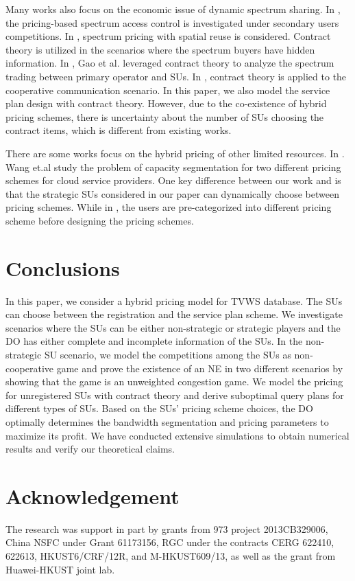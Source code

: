 \documentclass[journal]{IEEEtran}
\begin{document}
Many works also focus on the economic issue of dynamic spectrum sharing. In \cite{add1}, the pricing-based spectrum access control is investigated under secondary users competitions. In \cite{add2}, spectrum pricing with spatial reuse is considered. Contract theory is utilized in the scenarios where the spectrum buyers have hidden information. In \cite{JSAC10}, Gao et al. leveraged contract theory to analyze the spectrum trading between primary operator and SUs. In \cite{dyspan11Duan}, contract theory is applied to the cooperative communication scenario. In this paper, we also model the service plan design with contract theory. However, due to the co-existence of hybrid pricing schemes, there is uncertainty about the number of SUs choosing the contract items, which is different from existing works.

There are some works focus on the hybrid pricing of other limited resources. In \cite{icdcs12segmentation}. Wang et.al study the problem of capacity segmentation for two different pricing schemes for cloud service providers. One key difference between our work and \cite{icdcs12segmentation} is that the strategic SUs considered in our paper can dynamically choose between pricing schemes. While in \cite{icdcs12segmentation}, the users are pre-categorized into different pricing scheme before designing the pricing schemes.

\section{Conclusions}
\label{sec:conclusion}

In this paper, we consider a hybrid pricing model for TVWS database. The SUs can choose between the registration and the service plan scheme. We investigate scenarios where the SUs can be either non-strategic or strategic players and the DO has either complete and incomplete information of the SUs. In the non-strategic SU scenario, we model the competitions among the SUs as non-cooperative game and prove the existence of an NE in two different scenarios by showing that the game is an unweighted congestion game. We model the pricing for unregistered SUs with contract theory and derive suboptimal query plans for different types of SUs. Based on the SUs' pricing scheme choices, the DO optimally determines the bandwidth segmentation and pricing parameters to maximize its profit. We have conducted extensive simulations to obtain numerical results and verify our theoretical claims.

\section*{Acknowledgement}
The research was support in part by grants from 973 project 2013CB329006, China NSFC under Grant 61173156, RGC under the contracts CERG 622410, 622613, HKUST6/CRF/12R, and M-HKUST609/13, as well as the grant from Huawei-HKUST joint lab.
\end{document}
